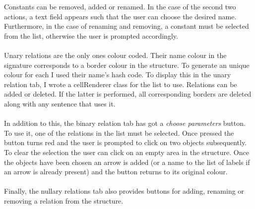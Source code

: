 \documentclass{report}
\begin{document}
\begin{enumerate}
\noindent Constants can be removed, added or renamed. In the case of the second 
two actions, a text field appears such that the user can choose the desired 
name. Furthermore, in the case of renaming and removing, a constant must be 
selected from the list, otherwise the user is prompted accordingly. 
\\ \\
Unary relations are the only ones colour coded. Their name colour in the 
signature corresponds to a border colour in the structure. To generate an unique 
colour for each I used their name's hash code. To display this in the unary 
relation tab, I wrote a cellRenderer class for the list to use. Relations can be 
added or deleted. If the latter is performed, all corresponding borders are 
deleted along with any sentence that uses it. 
\\ \\
In addition to this, the binary relation tab has got a \emph{choose parameters} 
button. To use it, one of the relations in the list must be selected. Once 
pressed the button turns red and the user is prompted to click on two objects 
subsequently. To clear the selection the user can click on an empty area in the 
structure. Once the objects have been chosen an arrow is added (or a name to the 
list of labels if an arrow is already present) and the button returns to its 
original colour. 
\\ \\
Finally, the nullary relations tab also provides buttons for adding, renaming or 
removing a relation from the structure.


\end{enumerate}
\end{document}
